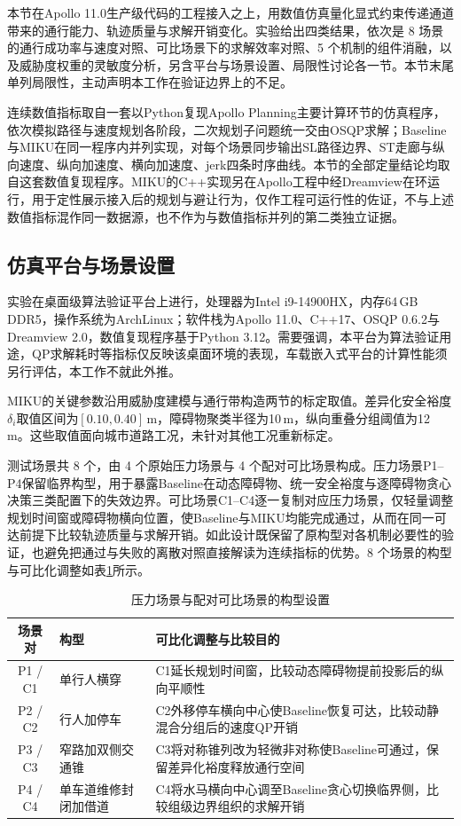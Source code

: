 \documentclass[a4paper,11pt]{ctexart}
\theoremstyle{definition}
\begin{document}
本节在Apollo 11.0生产级代码的工程接入之上，用数值仿真量化显式约束传递通道带来的通行能力、轨迹质量与求解开销变化。实验给出四类结果，依次是 8 场景的通行成功率与速度对照、可比场景下的求解效率对照、5 个机制的组件消融，以及威胁度权重的灵敏度分析，另含平台与场景设置、局限性讨论各一节。本节末尾单列局限性，主动声明本工作在验证边界上的不足。

连续数值指标取自一套以Python复现Apollo Planning主要计算环节的仿真程序，依次模拟路径与速度规划各阶段，二次规划子问题统一交由OSQP求解；Baseline与MIKU在同一程序内并列实现，对每个场景同步输出SL路径边界、ST走廊与纵向速度、纵向加速度、横向加速度、jerk四条时序曲线。本节的全部定量结论均取自这套数值复现程序。MIKU的C++实现另在Apollo工程中经Dreamview在环运行，用于定性展示接入后的规划与避让行为，仅作工程可运行性的佐证，不与上述数值指标混作同一数据源，也不作为与数值指标并列的第二类独立证据。

\subsection{仿真平台与场景设置}
\label{subsec:exp_setup}

实验在桌面级算法验证平台上进行，处理器为Intel i9-14900HX，内存64\,GB DDR5，操作系统为ArchLinux；软件栈为Apollo 11.0、C++17、OSQP 0.6.2与Dreamview 2.0，数值复现程序基于Python 3.12。需要强调，本平台为算法验证用途，QP求解耗时等指标仅反映该桌面环境的表现，车载嵌入式平台的计算性能须另行评估，本工作不就此外推。

MIKU的关键参数沿用威胁度建模与通行带构造两节的标定取值。差异化安全裕度$\delta_i$取值区间为$[0.10, 0.40]$\,m，障碍物聚类半径为10\,m，纵向重叠分组阈值为12\,m。这些取值面向城市道路工况，未针对其他工况重新标定。

测试场景共 8 个，由 4 个原始压力场景与 4 个配对可比场景构成。压力场景P1--P4保留临界构型，用于暴露Baseline在动态障碍物、统一安全裕度与逐障碍物贪心决策三类配置下的失效边界。可比场景C1--C4逐一复制对应压力场景，仅轻量调整规划时间窗或障碍物横向位置，使Baseline与MIKU均能完成通过，从而在同一可达前提下比较轨迹质量与求解开销。如此设计既保留了原构型对各机制必要性的验证，也避免把通过与失败的离散对照直接解读为连续指标的优势。8 个场景的构型与可比化调整如表\ref{tab:exp_scenarios}所示。

\begin{table}[htbp]
\centering
\caption{压力场景与配对可比场景的构型设置}
\label{tab:exp_scenarios}
\small
\begin{tabular}{c l p{7.4cm}}
\toprule
\textbf{场景对} & \textbf{构型} & \textbf{可比化调整与比较目的} \\
\midrule
P1 / C1 & 单行人横穿 & C1延长规划时间窗，比较动态障碍物提前投影后的纵向平顺性 \\
P2 / C2 & 行人加停车 & C2外移停车横向中心使Baseline恢复可达，比较动静混合分组后的速度QP开销 \\
P3 / C3 & 窄路加双侧交通锥 & C3将对称锥列改为轻微非对称使Baseline可通过，保留差异化裕度释放通行空间 \\
P4 / C4 & 单车道维修封闭加借道 & C4将水马横向中心调至Baseline贪心切换临界侧，比较组级边界组织的求解开销 \\
\bottomrule
\end{tabular}
\end{table}
\end{document}
